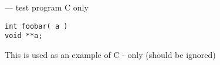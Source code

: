 \startmanpage
{}
--- test program C only 
\startvb\begin{verbatim}
int foobar( a )
void **a;

\end{verbatim}
\endvb
This is used as an example of C - only (should be ignored)
\endmanpage
